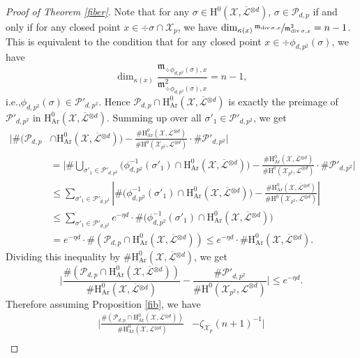 \documentclass[11pt]{article}
\newcommand{\ie}{i.e.,\xspace}
\numberwithin{equation}{section}
\theoremstyle{plain}
\theoremstyle{definition}
\newcommand{\ho}{\mathrm{H}}
\newcommand{\m}{\mathfrak{m}}
\newcommand{\X}{\mathcal{X}}
\newcommand{\Li}{\overline{\mathcal{L}}{}}
\newcommand{\li}{\mathcal{L}}
\begin{document}
\begin{proof}[Proof of Theorem \ref{fiber}]
Note that for any $\sigma\in \ho^0(\X, \Li^{\otimes d})$, $\sigma \in \mathcal{P}_{d,p}$ if and only if for any closed point $x\in \div \sigma\cap \X_p$, we have $\dim_{\kappa(x)}\sfrac{\m_{\div \sigma,x}}{\m^2_{\div \sigma, x}}=n-1$. This is equivalent to the condition that for any closed point $x\in \div \phi_{d,p^2}(\sigma)$, we have
\[
\dim_{\kappa(x)}\frac{\m_{\div \phi_{d,p^2}(\sigma),x}}{\m^2_{\div \phi_{d,p^2}(\sigma), x}}=n-1,
\]
\ie $\phi_{d,p^2}(\sigma)\in \mathcal{P}'_{d,p^2}$. Hence $\mathcal{P}_{d,p}\cap \ho^0_{\mathrm{Ar}}(\X, \Li^{\otimes d})$ is exactly the preimage of $\mathcal{P}'_{d,p^2}$ in $\ho^0_{\mathrm{Ar}}(\X, \Li^{\otimes d})$. Summing up over all $\sigma'_1\in \mathcal{P}'_{d,p^2}$, we get
\begin{align*}
\biggl| \#\bigl(\mathcal{P}_{d,p}&\cap \ho^0_{\mathrm{Ar}}(\X, \Li^{\otimes d})\bigr) -\frac{\#\ho^0_{\mathrm{Ar}}(\X, \Li^{\otimes d})}{\#\ho^0(\X_{p^2}, \li^{\otimes d})}\cdot\#\mathcal{P}'_{d,p^2} \biggr|\\
&=\biggl| \#\bigcup_{\sigma'_1\in \mathcal{P}'_{d,p^2}}\bigl(\phi_{d,p^2}^{-1}(\sigma'_1)\cap \ho^0_{\mathrm{Ar}}(\X, \Li^{\otimes d}) \bigr) -\frac{\#\ho^0_{\mathrm{Ar}}(\X, \Li^{\otimes d})}{\#\ho^0(\X_{p^2}, \li^{\otimes d})} \cdot \#\mathcal{P}'_{d,p^2} \biggr|
\end{align*}%
\vspace*{-1.45\baselineskip}%
\begin{align*}
&\leq \sum_{\sigma'_1\in \mathcal{P}'_{d,p^2}} \left| \#\bigl(\phi_{d,p^2}^{-1}(\sigma'_1)\cap \ho^0_{\mathrm{Ar}}(\X, \Li^{\otimes d}) \bigr)-\frac{\#\ho^0_{\mathrm{Ar}}(\X, \Li^{\otimes d})}{\#\ho^0(\X_{p^2}, \li^{\otimes d})} \right| \\
&\leq \sum_{\sigma'_1\in \mathcal{P}'_{d,p^2}} e^{-\eta d}\cdot \#\bigl(\phi_{d,p^2}^{-1}(\sigma'_1)\cap \ho^0_{\mathrm{Ar}}(\X, \Li^{\otimes d}) \bigr) \\
&= e^{-\eta d}\cdot \#\left(\mathcal{P}_{d,p}\cap \ho^0_{\mathrm{Ar}}(\X, \Li^{\otimes d})\right)\leq e^{-\eta d}\cdot\#\ho^0_{\mathrm{Ar}}(\X, \Li^{\otimes d}).
\end{align*}
Dividing this inequality by $\#\ho^0_{\mathrm{Ar}}(\X, \Li^{\otimes d})$, we get
\[
\biggl| \frac{\#\left(\mathcal{P}_{d,p}\cap \ho^0_{\mathrm{Ar}}(\X, \Li^{\otimes d})\right)}{\#\ho^0_{\mathrm{Ar}}(\X, \Li^{\otimes d})} -\frac{\#\mathcal{P}'_{d,p^2} }{\#\ho^0(\X_{p^2}, \li^{\otimes d})} \biggr|\leq e^{-\eta d}.
\]
Therefore assuming Proposition \ref{fib}, we have
\begin{align*}
\biggl| \frac{\#\left(\mathcal{P}_{d,p}\cap \ho^0_{\mathrm{Ar}}(\X, \Li^{\otimes d})\right)}{\#\ho^0_{\mathrm{Ar}}(\X, \Li^{\otimes d})} &-\zeta_{\X_p}(n+1)^{-1} \biggr| \\

\end{align*}
\end{proof}
\end{document}
